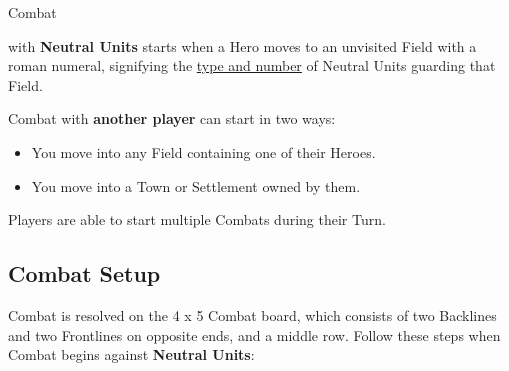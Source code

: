 
\begin{multicols}{2}

\hypertarget{Combat}{Combat} with \textbf{Neutral Units} starts when a Hero moves to an unvisited Field with a roman numeral, signifying the \hyperlink{Difficulty}{type and number} of Neutral Units guarding that Field.

Combat with \textbf{another player} can start in two ways:
\begin{itemize}
  \item You move into any Field containing one of their Heroes.
  \item You move into a Town or Settlement owned by them.
\end{itemize}
Players are able to start multiple Combats during their Turn.

\subsection*{\hypertarget{Combatsetup}{Combat Setup}}

Combat is resolved on the 4 x 5 Combat board, which consists of two Backlines and two Frontlines on opposite ends, and a middle row.
Follow these steps when Combat begins against \textbf{Neutral Units}:


\end{multicols}
